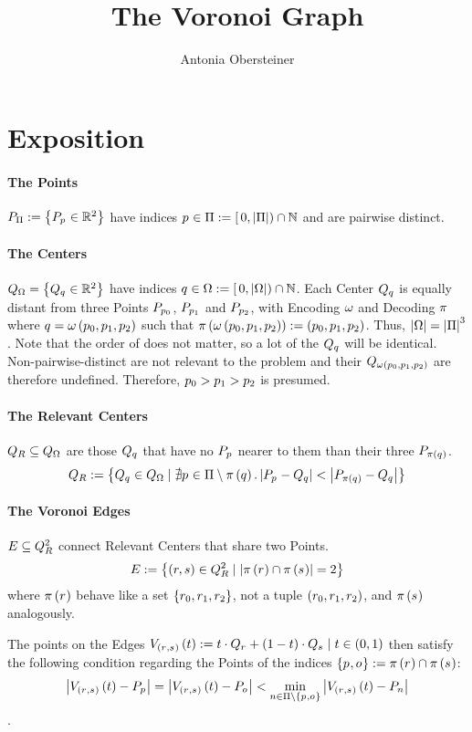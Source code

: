 \documentclass{article}
\author{Antonia Obersteiner}
\title{The Voronoi Graph}
\begin{document}
\section{Exposition}
\paragraph{The Points} $\points := \set{\point \in\reals^2}$ have
indices $\pointindex\in\pointindices := \oival{0, \abs{\pointindices}}\cap\nats$
and are pairwise distinct.

\paragraph{The Centers} $\cnters = \set{\cnter \in\reals^2}$ have
indices $\cnterindex\in\cnterindices := \oival{0, \abs{\cnterindices}}\cap\nats$.
Each Center $\cnter$ is equally distant from three Points
	$\point[{\pointindex[0]}]$,
	$\point[{\pointindex[1]}]$ and
	$\point[{\pointindex[2]}]$,
with Encoding $\Encode$ and Decoding $\Decode$ where
$\cnterindex = \encode{\triple{\pointindex}}$ such that
$\decode{\encode{\triple{\pointindex}}} := \of{\triple{\pointindex}}$.
Thus, $\abs{\cnterindices} = \abs{\pointindices}^3$\!.
Note that the order of \texttriple{\pointindex} does not matter,
so a lot of the $\cnter$ will be identical.
Non-pairwise-distinct \texttriple{\pointindex} are not relevant to the problem and
their $\cnter[\encode{\triple{\pointindex}}]$ are therefore undefined.
Therefore, $\pointindex[0] > \pointindex[1] > \pointindex[2]$ is presumed.

\paragraph{The Relevant Centers} $\relevants \subseteq \cnters$ are those
$\cnter$ that have no $\point$ nearer to them than their three
$\point[\decode{\cnterindex}]$.
$$
\relevants := \set{\cnter\in\cnters \mid \nexists
\pointindex\in\pointindices\setminus\decode{q}. \abs{\point -
\cnter} < \abs{\point[\decode{\cnterindex}] - \cnter}}
$$

\paragraph{The Voronoi Edges} $\edges\subseteq\relevants^2$ connect Relevant Centers
that share two Points.
$$
\edges := \set{(r, s)\in\relevants^2 \mid
\abs{\decode{\relevantindex} \cap \decode{\selevantindex}} = 2}
$$
where $\decode{\relevantindex}$ behave like a set
$\set{\triple{\relevantindex}}$, not a tuple $\of{\triple{\relevantindex}}$,
and $\decode{\selevantindex}$ ana\-lo\-gous\-ly.

The points on the Edges $\edgepoint\of t :=
t\cdot\relevant+(1-t)\cdot\selevant \mid t\in(0, 1)$ then satisfy the following
condition regarding the Points of the indices $\set{\pointindex, \oointindex} :=
\decode{\relevantindex} \cap \decode{\selevantindex}$:
$$
\abs{\edgepoint\of t - \point} =
\abs{\edgepoint\of t - \ooint} <
\min_{n\in\pointindices\setminus\set{\pointindex, \oointindex}}
\abs{\edgepoint\of t - \point[n]}
$$.
\end{document}
